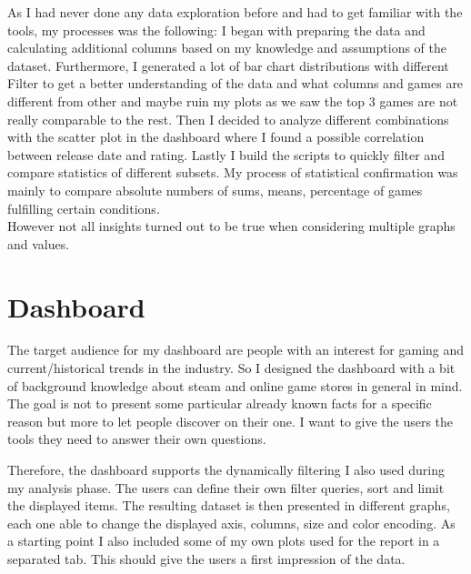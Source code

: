 \documentclass[11pt]{article}
\begin{document}
As I had never done any data exploration before and had to get familiar with the tools, my processes was the following: I began with preparing the data and calculating additional columns based on my knowledge and assumptions of the dataset. Furthermore, I generated a lot of bar chart distributions with different Filter to get a better understanding of the data and what columns and games are different from other and maybe ruin my plots as we saw the top 3 games are not really comparable to the rest.
Then I decided to analyze different combinations with the scatter plot in the dashboard where I found a possible correlation between release date and rating. Lastly I build the scripts to quickly filter and compare statistics of different subsets. My process of statistical confirmation was mainly to compare absolute numbers of sums, means, percentage of games fulfilling certain conditions.\\
However not all insights turned out to be true when considering multiple graphs and values. 

\section{Dashboard}

The target audience for my dashboard are people with an interest for gaming and current/historical trends in the industry. 
So I designed the dashboard with a bit of background knowledge about steam and online game stores in general in mind. 
The goal is not to present some particular already known facts for a specific reason but more to let people discover on their one. I want to give the users the tools they need to answer their own questions.

Therefore, the dashboard supports the dynamically filtering I also used during my analysis phase. The users can define their own filter queries, sort and limit the displayed items. The resulting dataset is then presented in different graphs, each one able to change the displayed axis, columns, size and color encoding. As a starting point I also included some of my own plots used for the report in a separated tab. This should give the users a first impression of the data. 
\end{document}
